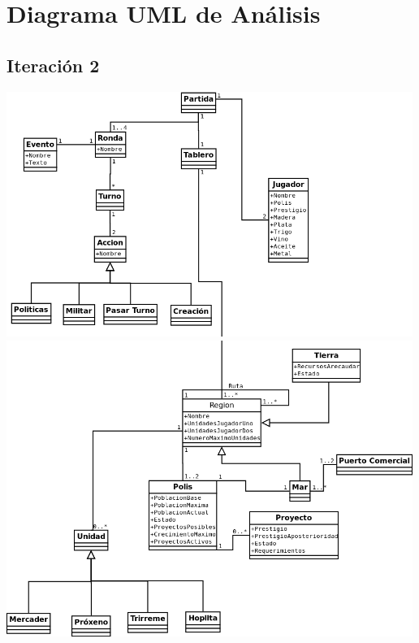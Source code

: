 \documentclass[11 pt]{book}
\begin{document}
\chapter{Diagrama UML de Análisis}
	\section*{Iteración 2}
		\begin{center}
			\includegraphics[width=500px]{analysis-uml/iteration2/part1.png}
			\includegraphics[width=500px]{analysis-uml/iteration2/part2.png}
		\end{center}
\end{document}
